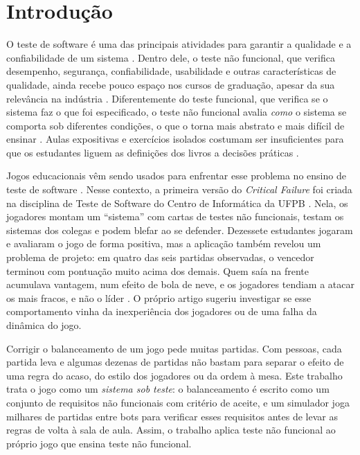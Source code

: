 \section{Introdução}
\label{sec:introducao}

O teste de software é uma das principais atividades para garantir a qualidade e a confiabilidade de um
sistema \cite{ahamed2010}. Dentro dele, o teste não funcional, que verifica desempenho, segurança,
confiabilidade, usabilidade e outras características de qualidade, ainda recebe pouco espaço nos cursos de
graduação, apesar da sua relevância na indústria \cite{garousi2020}. Diferentemente do teste funcional, que
verifica se o sistema faz o que foi especificado, o teste não funcional avalia \emph{como} o sistema se comporta
sob diferentes condições, o que o torna mais abstrato e mais difícil de ensinar \cite{paschoal2018}. Aulas
expositivas e exercícios isolados costumam ser insuficientes para que os estudantes liguem as definições dos
livros a decisões práticas \cite{valle2015,vanhanen2018}.

Jogos educacionais vêm sendo usados para enfrentar esse problema no ensino de teste de software
\cite{costa2024debug,gomes2021gamut,beppe2018greatest,jesus2020}. Nesse contexto, a primeira versão do
\emph{Critical Failure} foi criada na disciplina de Teste de Software do Centro de Informática da UFPB
\cite{oliveira2025critical}. Nela, os jogadores montam um ``sistema'' com cartas de testes não funcionais, testam
os sistemas dos colegas e podem blefar ao se defender. Dezessete estudantes jogaram e avaliaram o jogo de forma
positiva, mas a aplicação também revelou um problema de projeto: em quatro das seis partidas observadas, o
vencedor terminou com pontuação muito acima dos demais. Quem saía na frente acumulava vantagem, num efeito de
bola de neve, e os jogadores tendiam a atacar os mais fracos, e não o líder \cite{oliveira2025critical}. O próprio artigo sugeriu
investigar se esse comportamento vinha da inexperiência dos jogadores ou de uma falha da dinâmica do jogo.

Corrigir o balanceamento de um jogo pede muitas partidas. Com pessoas, cada partida leva  e
algumas dezenas de partidas não bastam para separar o efeito de uma regra do acaso, do estilo dos jogadores ou
da ordem à mesa. Este trabalho trata o jogo como um \emph{sistema sob teste}: o balanceamento é escrito como um
conjunto de requisitos não funcionais com critério de aceite, e um simulador joga milhares de partidas entre
bots para verificar esses requisitos antes de levar as regras de volta à sala de aula. Assim, o trabalho aplica
teste não funcional ao próprio jogo que ensina teste não funcional.

